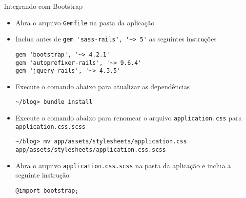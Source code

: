 \begin{frame}{Integrando com Bootstrap}
    \begin{itemize}
      \item Abra o arquivo \verb|Gemfile| na pasta da aplicação
      \item Inclua antes de \verb|gem 'sass-rails', '~> 5'| as seguintes instruções
      \begin{lstlisting}[style=BashInputStyle]
gem 'bootstrap', '~> 4.2.1'
gem 'autoprefixer-rails', '~> 9.6.4'
gem 'jquery-rails', '~> 4.3.5'
      \end{lstlisting}
      \item Execute o comando abaixo para atualizar as dependências
      \begin{lstlisting}[style=BashInputStyle]
~/blog> bundle install 
      \end{lstlisting}
      \item Execute o comando abaixo para renomear o arquivo \verb|application.css| para \verb|application.css.scss|
      \begin{lstlisting}[style=BashInputStyle, basicstyle=\tiny\ttfamily]
~/blog> mv app/assets/stylesheets/application.css  app/assets/stylesheets/application.css.scss
      \end{lstlisting}
      \item Abra o arquivo \verb|application.css.scss| na pasta da aplicação e inclua a seguinte instrução
      \begin{lstlisting}[style=RubyInputStyle, basicstyle=\tiny\ttfamily, caption=app/assets/stylesheets/application.css.scss]
@import bootstrap;
      \end{lstlisting}
  \end{itemize}
\end{frame} 